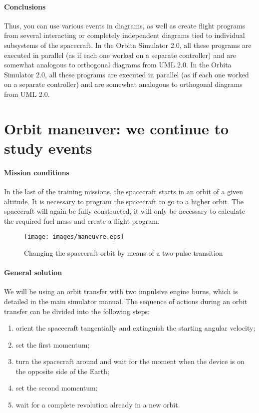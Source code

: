 \documentclass[12pt,a4paper]{article}
\begin{document}
\paragraph{Conclusions} Thus, you can use various events in diagrams, as well as create flight programs from several interacting or completely independent diagrams tied to individual subsystems of the spacecraft. In the Orbita Simulator 2.0, all these programs are executed in parallel (as if each one worked on a separate controller) and are somewhat analogous to orthogonal diagrams from UML 2.0. In the Orbita Simulator 2.0, all these programs are executed in parallel (as if each one worked on a separate controller) and are somewhat analogous to orthogonal diagrams from UML 2.0.

\clearpage
\section{Orbit maneuver: we continue to study events}

\paragraph{Mission conditions} In the last of the training missions, the spacecraft starts in an orbit of a given altitude. It is necessary to program the spacecraft to go to a higher orbit. The spacecraft will again be fully constructed, it will only be necessary to calculate the required fuel mass and create a flight program.

\begin{figure}[tbh]
  \begin{center}
    \texttt{[image: images/maneuvre.eps]}
    \caption{Changing the spacecraft orbit by means of a two-pulse transition}
    \label{Pic:Maneuvre}
  \end{center}
\end{figure}

\paragraph{General solution} We will be using an orbit transfer with two impulsive engine burns, which is detailed in the main simulator manual. The sequence of actions during an orbit transfer can be divided into the following steps:

\begin{enumerate}
\item orient the spacecraft tangentially and extinguish the starting angular velocity;
\item set the first momentum;
\item turn the spacecraft around and wait for the moment when the device is on the opposite side of the Earth;
\item set the second momentum;
\item wait for a complete revolution already in a new orbit.
\end{enumerate}
\end{document}
